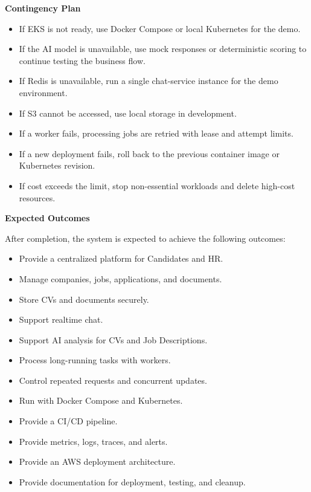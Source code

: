 \vspace{0.5em}\noindent\textbf{Contingency Plan}\par

\begin{itemize}
\tightlist
\item
  If EKS is not ready, use Docker Compose or local Kubernetes for the
  demo.
\item
  If the AI model is unavailable, use mock responses or deterministic
  scoring to continue testing the business flow.
\item
  If Redis is unavailable, run a single chat-service instance for the
  demo environment.
\item
  If S3 cannot be accessed, use local storage in development.
\item
  If a worker fails, processing jobs are retried with lease and attempt
  limits.
\item
  If a new deployment fails, roll back to the previous container image
  or Kubernetes revision.
\item
  If cost exceeds the limit, stop non-essential workloads and delete
  high-cost resources.
\end{itemize}

\vspace{0.5em}\noindent\textbf{Expected Outcomes}\par

After completion, the system is expected to achieve the following
outcomes:

\begin{itemize}
\tightlist
\item
  Provide a centralized platform for Candidates and HR.
\item
  Manage companies, jobs, applications, and documents.
\item
  Store CVs and documents securely.
\item
  Support realtime chat.
\item
  Support AI analysis for CVs and Job Descriptions.
\item
  Process long-running tasks with workers.
\item
  Control repeated requests and concurrent updates.
\item
  Run with Docker Compose and Kubernetes.
\item
  Provide a CI/CD pipeline.
\item
  Provide metrics, logs, traces, and alerts.
\item
  Provide an AWS deployment architecture.
\item
  Provide documentation for deployment, testing, and cleanup.
\end{itemize}

